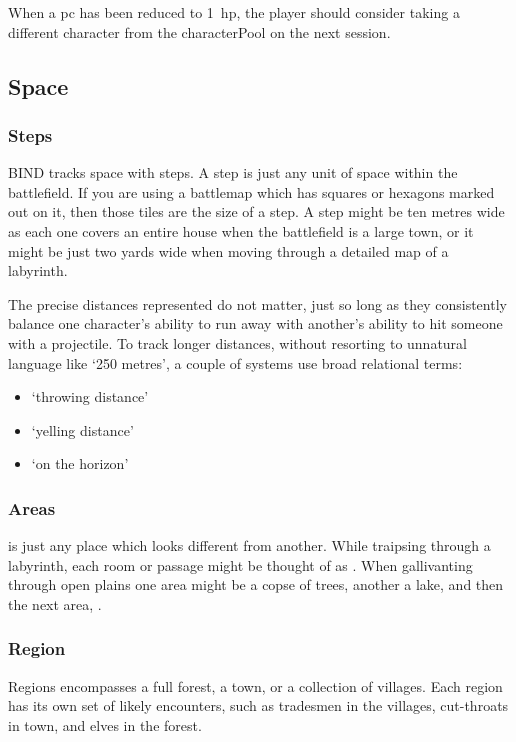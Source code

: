 \begin{multicols}{2}
When a \gls{pc} has been reduced to 1~\gls{hp}, the player should consider taking a different character from the \gls{characterPool} on the next session.

\subsection{Space}
\label{space}

\subsubsection{Steps}

BIND tracks space with \glspl{step}.
A \gls{step} is just any unit of space within the battlefield.
If you are using a battlemap which has squares or hexagons marked out on it, then those tiles are the size of a step.
A step might be ten metres wide as each one covers an entire house when the battlefield is a large town, or it might be just two yards wide when moving through a detailed map of a labyrinth.

The precise distances represented do not matter, just so long as they consistently balance one character's ability to run away with another's ability to hit someone with a projectile.
To track longer distances, without resorting to unnatural language like `250 metres', a couple of systems use broad relational terms:

\begin{itemize}
  \item
  `throwing distance'
  \item
  `yelling distance'
  \item
  `on the horizon'
\end{itemize}

\subsubsection{Areas}

 is just any place which looks different from another.
While traipsing through a labyrinth, each room or passage might be thought of as .
When gallivanting through open plains one \gls{area} might be a copse of trees, another a lake, and then the next area, .

\subsubsection{Region}

Regions encompasses a full forest, a town, or a collection of \glspl{village}.
Each region has its own set of likely encounters, such as tradesmen in the \glspl{village}, cut-throats in town, and elves in the forest.

\end{multicols}

